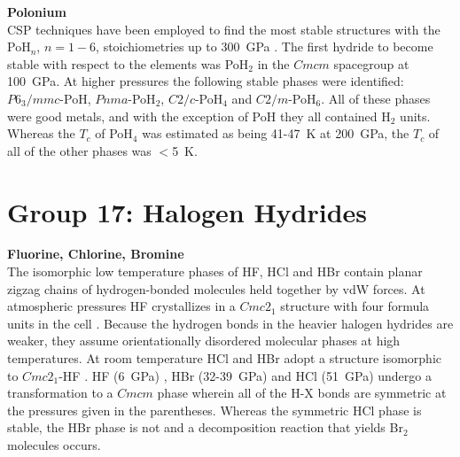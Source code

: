 \documentclass[12pt,letterpaper,oneside]{article}
\begin{document}
\noindent\textbf{Polonium} \\ 
%
CSP techniques have been employed to find the most stable structures with the PoH$_n$, $n=1-6$, stoichiometries up to 300~GPa \cite{Liu:2015d}. The first hydride to become stable with respect to the elements was PoH$_2$ in the $Cmcm$ spacegroup at 100~GPa. At higher pressures the following stable phases were identified: $P6_3/mmc$-PoH, $Pnma$-PoH$_2$, $C2/c$-PoH$_4$ and $C2/m$-PoH$_6$. All of these phases were good metals, and with the exception of PoH they all contained H$_2$ units. Whereas the $T_c$ of PoH$_4$ was estimated as being 41-47~K at 200~GPa, the $T_c$ of all of the other phases was $<$5~K. 





\section{Group 17: Halogen Hydrides} 

\noindent\textbf{Fluorine, Chlorine, Bromine} \\
%
The isomorphic low temperature phases of HF, HCl and HBr contain planar zigzag chains of hydrogen-bonded molecules held together by vdW forces. At atmospheric pressures HF crystallizes in a $Cmc2_1$ structure with four formula units in the cell \cite{Johnson:1975a}. Because the hydrogen bonds in the heavier halogen hydrides are weaker, they assume orientationally disordered molecular phases at high temperatures. At room temperature HCl and HBr adopt a structure isomorphic to  $Cmc2_1$-HF \cite{Sandor:1967a,Ikram:1993a}. HF (6~GPa) \cite{Pinnick:1989a}, HBr (32-39~GPa) \cite{Katoh:1999a} and HCl (51~GPa) \cite{Aoki:1999a} undergo a transformation to a $Cmcm$ phase wherein all of the H-X bonds are symmetric at the pressures given in the parentheses. Whereas the symmetric HCl phase is stable, the HBr phase is not \cite{Ikeda:1999a} and a decomposition reaction that yields Br$_2$ molecules occurs. 
\end{document}
